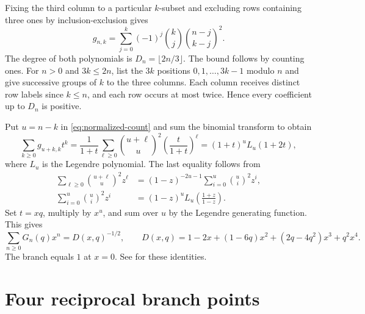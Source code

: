 \documentclass[11pt]{article}
\begin{document}
Fixing the third column to a particular $k$-subset and excluding rows containing three ones by inclusion-exclusion gives
\begin{equation}
g_{n,k}=\sum_{j=0}^k(-1)^j\binom kj\binom{n-j}{k-j}^2.
\label{eq:normalized-count}
\end{equation}
The degree of both polynomials is $D_n=\lfloor2n/3\rfloor$. The bound follows by counting ones. For $n>0$ and $3k\leq2n$, list the $3k$ positions $0,1,\ldots,3k-1$ modulo $n$ and give successive groups of $k$ to the three columns. Each column receives distinct row labels since $k\le n$, and each row occurs at most twice. Hence every coefficient up to $D_n$ is positive.

Put $u=n-k$ in \eqref{eq:normalized-count} and sum the binomial transform to obtain
\[
\sum_{k\ge0}g_{u+k,k}t^k
 =\frac1{1+t}\sum_{\ell\ge0}\binom{u+\ell}{u}^2
   \left(\frac{t}{1+t}\right)^\ell
 =(1+t)^u L_u(1+2t),
\]
where $L_u$ is the Legendre polynomial. The last equality follows from
\begin{align*}
\sum_{\ell\ge0}\binom{u+\ell}{u}^{2}z^\ell
   &=(1-z)^{-2u-1}\sum_{i=0}^{u}\binom ui^2z^i,\\
\sum_{i=0}^{u}\binom ui^2z^i
   &=(1-z)^uL_u\left(\frac{1+z}{1-z}\right).
\end{align*}
Set $t=xq$, multiply by $x^u$, and sum over $u$ by the Legendre generating function. This gives
\begin{equation}
\sum_{n\ge0}G_n(q)x^n=D(x,q)^{-1/2},\qquad
D(x,q)=1-2x+(1-6q)x^2+(2q-4q^2)x^3+q^2x^4.
\label{eq:gf}
\end{equation}
The branch equals $1$ at $x=0$. See \cite[(15.8.1), (18.5.8), and (18.12.11)]{dlmf} for these identities.

\section{Four reciprocal branch points}\label{sec:branch}
\end{document}
